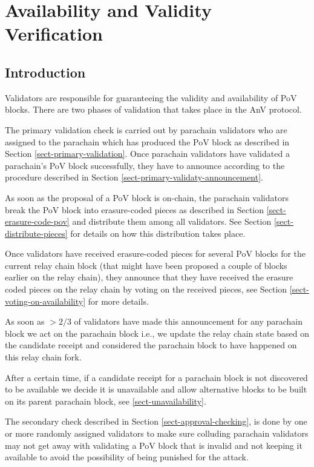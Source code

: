 \chapter{Availability and Validity Verification}

\section{Introduction}

Validators are responsible for guaranteeing the validity and availability of PoV blocks. 
There are two phases of validation that takes place in the AnV protocol. 

The primary validation check is carried out by parachain validators who are assigned to the parachain which has produced the PoV block as described in Section \ref{sect-primary-validation}. Once parachain validators have validated a parachain's PoV block successfully, they have to announce according to the procedure described in Section \ref{sect-primary-validaty-announcement}.

As soon as the proposal of a PoV block is on-chain, the parachain validators break the PoV block into erasure-coded pieces as described in Section \ref{sect-erasure-code-pov} and distribute them among all validators. See Section \ref{sect-distribute-pieces} for details on how this distribution takes place.
	 
Once validators have received erasure-coded pieces for several PoV blocks for the current relay chain block (that might have been proposed a couple of blocks earlier on the relay chain), they announce that they have received the erasure coded pieces on the relay chain by voting on the received pieces, see Section \ref{sect-voting-on-availability} for more details. 

As soon as $>2/3$ of validators have made this announcement for any parachain block we act on the parachain block i.e., we update the relay chain state based on the candidate receipt and considered the parachain block to have happened on this relay chain fork. 

After a certain time, if a candidate receipt for a parachain block is not discovered to be available we decide it is unavailable and allow alternative blocks to be built on its parent parachain block, see \ref{sect-unavailability}. 

The secondary check described in Section \ref{sect-approval-checking}, is done by one or more randomly assigned validators to make sure colluding parachain validators may not get away with validating a PoV block that is invalid and not keeping it available to avoid the possibility of being punished for the attack.

